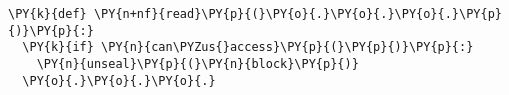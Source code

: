 \begin{Verbatim}[commandchars=\\\{\},codes={\catcode`\$=3\catcode`\^=7\catcode`\_=8},fontsize=\scriptsize]
\PY{k}{def} \PY{n+nf}{read}\PY{p}{(}\PY{o}{.}\PY{o}{.}\PY{o}{.}\PY{p}{)}\PY{p}{:}
  \PY{k}{if} \PY{n}{can\PYZus{}access}\PY{p}{(}\PY{p}{)}\PY{p}{:}
    \PY{n}{unseal}\PY{p}{(}\PY{n}{block}\PY{p}{)}
  \PY{o}{.}\PY{o}{.}\PY{o}{.}
\end{Verbatim}
